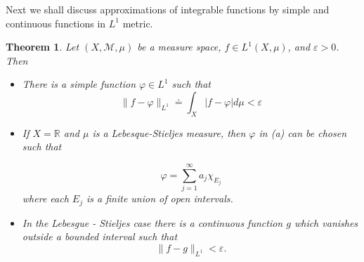 \documentclass[12pt]{report}
\newtheorem{theorem}{Theorem}[section]
\begin{document}
\medskip
\noindent
Next we shall discuss approximations
of integrable functions by  simple and continuous functions in $L^1$
metric.

\begin{theorem}  Let $(X, \mathcal{M}, \mu)$ be a measure space, $f \in
L^1(X,
\mu)$, and $\varepsilon > 0$.  Then

\begin{itemize}
\item[(a)]  There is a simple function $\varphi \in L^1$ such that
\[
\|f - \varphi\|_{L^1} \doteq \int_X |f - \varphi| d \mu < \varepsilon
\]
\item[(b)]  If $X = \mathbb{R}$ and $\mu$ is a Lebesque-Stieljes
measure, then
$\varphi$ in (a) can be chosen such that

\[
\varphi = \sum^{\infty}_{j=1} a_j \chi_{E_j}
\]
 where each $E_j$ is a finite union of open  intervals.
\item[(c)]  In the Lebesgue - Stieljes case there is a continuous function
$g$ which  vanishes outside a bounded interval such that
\[
\|f-g\|_{L^1} < \varepsilon.
\]
\end{itemize}
\end{theorem}

\end{document}
